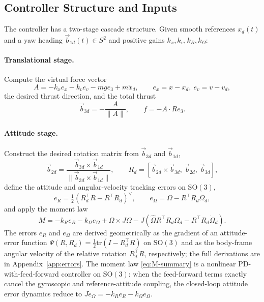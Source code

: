 \documentclass[11pt]{article}
\theoremstyle{remark}
\newcommand{\SO}{\mathrm{SO}(3)}
\newcommand{\tr}{\mathrm{tr}}
\newcommand{\hatmap}[1]{\widehat{#1}}
\begin{document}
\subsection{Controller Structure and Inputs}
\label{sec:controller-structure}

The controller has a two-stage cascade structure. Given smooth references $x_d(t)$ and a yaw heading $\vec{b}_{1d}(t)\in S^2$ and positive gains $k_x, k_v, k_R, k_\Omega$:

\paragraph{Translational stage.} Compute the virtual force vector
\begin{equation}
    A = -k_x e_x - k_v e_v - mg e_3 + m\ddot x_d, \qquad e_x = x - x_d,\ e_v = v - v_d,
\end{equation}
the desired thrust direction, and the total thrust
\begin{equation}
    \vec{b}_{3d} = -\frac{A}{\|A\|}, \qquad f = -A\cdot Re_3.
    \label{eq:b3d-f-summary}
\end{equation}

\paragraph{Attitude stage.} Construct the desired rotation matrix from $\vec{b}_{3d}$ and $\vec{b}_{1d}$,
\begin{equation}
    \vec{b}_{2d} = \frac{\vec{b}_{3d}\times\vec{b}_{1d}}{\|\vec{b}_{3d}\times\vec{b}_{1d}\|},\qquad
    R_d = [\vec{b}_{2d}\times\vec{b}_{3d},\ \vec{b}_{2d},\ \vec{b}_{3d}],
\end{equation}
define the attitude and angular-velocity tracking errors on $\SO$,
\begin{equation}
    e_R = \tfrac{1}{2}(R_d^\top R - R^\top R_d)^\vee,\qquad
    e_\Omega = \Omega - R^\top R_d \Omega_d,
    \label{eq:eR-eOm-summary}
\end{equation}
and apply the moment law
\begin{equation}
    M = -k_R e_R - k_\Omega e_\Omega + \Omega\times J\Omega - J(\hatmap{\Omega}R^\top R_d\Omega_d - R^\top R_d \dot\Omega_d).
    \label{eq:M-summary}
\end{equation}
The errors $e_R$ and $e_\Omega$ are derived geometrically as the gradient of an attitude-error function $\Psi(R,R_d) = \tfrac{1}{2}\tr(I - R_d^\top R)$ on $\SO$ and as the body-frame angular velocity of the relative rotation $R_d^\top R$, respectively; the full derivations are in Appendix~\ref{app:errors}. The moment law \eqref{eq:M-summary} is a nonlinear PD-with-feed-forward controller on $\SO$: when the feed-forward terms exactly cancel the gyroscopic and reference-attitude coupling, the closed-loop attitude error dynamics reduce to $J\dot e_\Omega = -k_R e_R - k_\Omega e_\Omega$.
\end{document}
